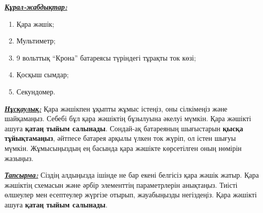 
\textbf{\uline{\textit{Құрал-жабдықтар:}}}

\vspace*{6pt}

\begin{enumerate}[label=\textbf{\arabic*.}]
    \item Қара жәшік;
    \item Мультиметр;
    \item 9 вольттық ``Крона'' батареясы түріндегі тұрақты ток көзі;
    \item Қосқыш сымдар;
    \item Секундомер.
\end{enumerate}

\vspace{10pt}

\textbf{\uline{\textit{Нұсқаулық:}}} Қара жәшікпен ұқыпты жұмыс істеңіз, оны сілкімеңіз және шайқамаңыз. Себебі бұл қара жәшіктің бұзылуына әкелуі мүмкін. Қара жәшікті ашуға \textbf{қатаң тыйым салынады}. Сондай-ақ батареяның шығыстарын \textbf{қысқа тұйықтамаңыз}, әйтпесе батарея арқылы үлкен ток жүріп, ол істен шығуы мүмкін. Жұмысыңыздың ең басында қара жәшікте көрсетілген оның нөмірін жазыңыз.

\vspace{10pt}

\textbf{\uline{\textit{Тапсырма:}}} Сіздің алдыңызда ішінде не бар екені белгісіз қара жәшік жатыр. Қара жәшіктің схемасын және әрбір элементтің параметрлерін анықтаңыз. Тиісті өлшеулер мен есептеулер жүргізе отырып, жауабыңызды негіздеңіз. Қара жәшікті ашуға \textbf{қатаң тыйым салынады}.
